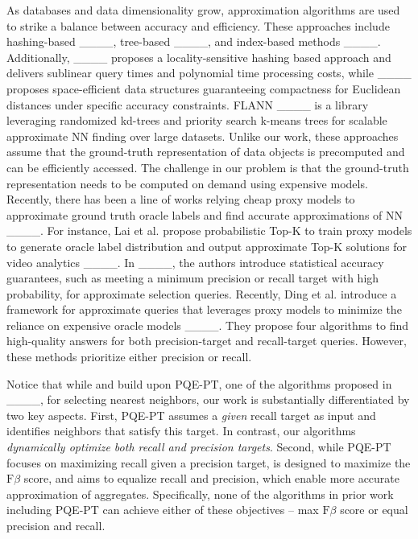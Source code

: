 As databases and data dimensionality grow, approximation algorithms are used to strike a balance between accuracy and efficiency. These approaches include hashing-based ____, tree-based ____, and index-based methods ____. Additionally, ____ proposes a locality-sensitive hashing based approach and delivers sublinear query times and polynomial time processing costs, while ____ proposes space-efficient data structures guaranteeing compactness for Euclidean distances under specific accuracy constraints. FLANN ____ is a library leveraging randomized kd-trees and priority search k-means trees for scalable approximate NN finding over large datasets. Unlike our work, these approaches assume that the ground-truth representation of data objects is precomputed and can be efficiently accessed. The challenge in our problem is that the ground-truth representation needs to be computed on demand using expensive models. Recently, there has been a line of works relying cheap proxy models to approximate ground truth oracle labels and find accurate approximations of NN ____. For instance, Lai et al. propose probabilistic Top-K to train proxy models to generate oracle label distribution and output approximate Top-K solutions for video analytics ____. In ____, the authors introduce statistical accuracy guarantees, such as meeting a minimum precision or recall target with high probability, for approximate selection queries. Recently, Ding et al. introduce a  framework for approximate queries that leverages proxy models to minimize the reliance on expensive oracle models ____. They propose four algorithms to find high-quality answers for both precision-target and recall-target queries. However, these methods prioritize either precision or recall. 

Notice that while \sprintv and \sprintc build upon PQE-PT, one of the algorithms proposed in ____, for selecting nearest neighbors, our work is substantially differentiated by two key aspects. First, PQE-PT assumes a \textit{given} recall target as input and identifies neighbors that satisfy this target. In contrast, our algorithms \textit{dynamically optimize both recall and precision targets}. Second, while PQE-PT focuses on maximizing recall given a precision target, \sprintv is designed to maximize the \(\text{F}{\beta}\) score, and \sprintc aims to equalize recall and precision, which enable more accurate approximation of aggregates. Specifically, none of the algorithms in prior work including PQE-PT can achieve either of these objectives -- max \(\text{F}{\beta}\) score or equal precision and recall.

